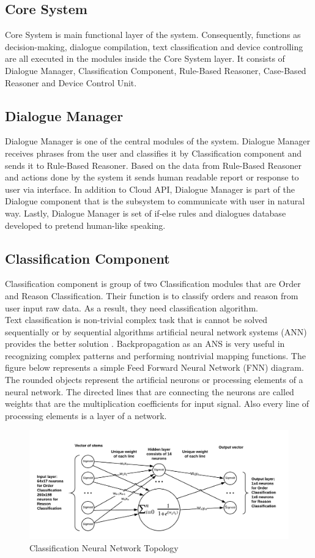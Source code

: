 \documentclass{llncs}
\begin{document}
    \subsection{Core System}
    Core System is main functional layer of the system.
    Consequently, functions as decision-making, dialogue compilation, text classification and device controlling are all executed in the modules inside the Core System layer.
    It consists of Dialogue Manager, Classification Component, Rule-Based Reasoner, Case-Based Reasoner and Device Control Unit.
    \subsection{Dialogue Manager}
    Dialogue Manager is one of the central modules of the system.
    Dialogue Manager receives phrases from the user and classifies it by Classification component and sends it to Rule-Based Reasoner.
    Based on the data from Rule-Based Reasoner and actions done by the system it sends human readable report or response to user via interface.
    In addition to Cloud API, Dialogue Manager is part of the Dialogue component that is the subsystem to communicate with user in natural way.
    Lastly, Dialogue Manager is set of if-else rules and dialogues database developed to pretend human-like speaking.
    \subsection{Classification Component}
    Classification component is group of two Classification modules that are Order and Reason Classification.
    Their function is to classify orders and reason from user input raw data.
    As a result, they need classification algorithm.\\
    Text classification is non-trivial complex task that is cannot be solved sequentially or by sequential algorithms artificial neural network systems (ANN) provides the better solution \cite{14}.
    Backpropagation as an ANS is very useful in recognizing complex patterns and performing nontrivial mapping functions.
    The figure below represents a simple Feed Forward Neural Network (FNN) diagram.
    The rounded objects represent the artificial neurons or processing elements of a neural network.
    The directed lines that are connecting the neurons are called weights that are the multiplication coefficients for input signal.
    Also every line of processing elements is a layer of a network.
    \begin{figure}
        \includegraphics[width=\textwidth]{ANN.png}
        \caption[]{Classification Neural Network Topology}
    \end{figure}
\end{document}
